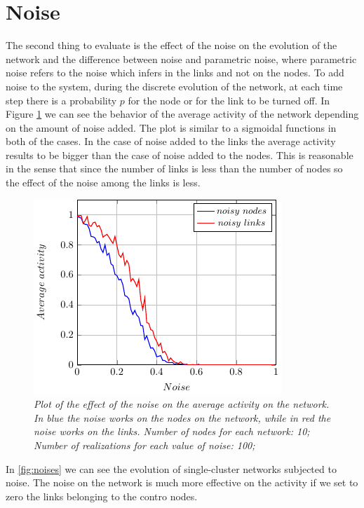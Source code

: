 \section{Noise}
The second thing to evaluate is the effect of the noise on the evolution of the network and the difference between noise and parametric noise, where parametric noise refers to the noise which infers in the links and not on the nodes.
To add noise to the system, during the discrete evolution of the network, at each time step there is a probability $p$ for the node or for the link to be turned off.
In Figure \ref{fig:noise} we can see the behavior of the average activity of the network depending on the amount of noise added. The plot is similar to a sigmoidal functions in both of the cases. In the case of noise added to the links the average activity results to be bigger than the case of noise added to the nodes. This is reasonable in the sense that since the number of links is less than the number of nodes so the effect of the noise among the links is less.
\begin{figure}[H]
\centering
\includegraphics[scale=1.4]{images/noise.pdf}
\caption{\emph{Plot of the effect of the noise on the average activity on the network. In blue the noise works on the nodes on the network, while in red the noise works on the links. Number of nodes for each network: 10; Number of realizations for each value of noise: 100; }}
\label{fig:noise}
\end{figure}

In \ref{fig:noises} we can see the evolution of single-cluster networks subjected to noise. The noise on the network is much more effective on the activity if we set to zero the links belonging to the contro nodes.


